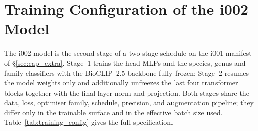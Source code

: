 
\section{Training Configuration of the i002 Model}
\label{sec:training_config}

The i002 model is the second stage of a two-stage schedule on the i001 manifest of
\S\ref{sec:cap_extra}. Stage~1 trains the head MLPs and the species, genus and family classifiers
with the BioCLIP~2.5 backbone fully frozen; Stage~2 resumes the model weights only and additionally
unfreezes the last four transformer blocks together with the final layer norm and projection.
Both stages share the data, loss, optimiser family, schedule, precision, and augmentation
pipeline; they differ only in the trainable surface and in the effective batch size used.
Table~\ref{tab:training_config} gives the full specification.


